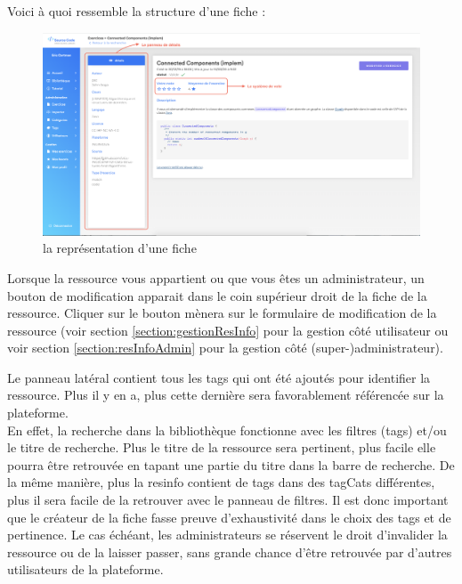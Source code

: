 Voici à quoi ressemble la structure d'une \gls{fiche} :

\begin{figure}[H]
    \includegraphics[width=\textwidth,height=\textheight,keepaspectratio]{images/client/fiche.png}
    \centering
    \caption[SourceCode : la représentation d'une \gls{fiche}]{la représentation d'une \gls{fiche}}
\end{figure}

Lorsque la ressource vous appartient ou que vous êtes un administrateur, un bouton de modification apparait dans le coin supérieur droit de la \gls{fiche} de la ressource. Cliquer sur le bouton mènera sur le formulaire de modification de la ressource (voir section \ref{section:gestionResInfo} pour la gestion côté utilisateur ou voir section \ref{section:resInfoAdmin} pour la gestion côté (super-)administrateur).\\


Le panneau latéral contient tous les \glspl{tag} qui ont été ajoutés pour identifier la ressource. Plus il y en a, plus cette dernière sera favorablement référencée sur la plateforme.\\

En effet, la recherche dans la bibliothèque fonctionne avec les filtres (\glspl{tag}) et/ou le titre de recherche. Plus le titre de la ressource sera pertinent, plus facile elle pourra être retrouvée en tapant une partie du titre dans la barre de recherche. 
De la même manière, plus la \gls{resinfo} contient de \glspl{tag} dans des \glspl{tagCat} différentes, plus il sera facile de la retrouver avec le panneau de filtres. Il est donc important que le créateur de la \gls{fiche} fasse preuve d'exhaustivité dans le choix des \glspl{tag} et de pertinence. Le cas échéant, les administrateurs se réservent le droit d'invalider la ressource ou de la laisser passer, sans grande chance d'être retrouvée par d'autres utilisateurs de la plateforme.

